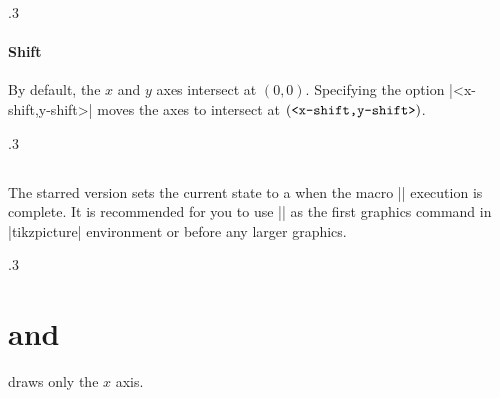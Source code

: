 \begin{tzcode}{.3}
\end{tzcode}

\paragraph{Shift}
By default, the $x$ and $y$ axes intersect at $(0,0)$.
Specifying the option |<x-shift,y-shift>| moves the axes to intersect at $(\text{\ttfamily<x-shift,y-shift>})$.


\begin{tzcode}{.3}
\end{tzcode}


\subsection{\protect\cmd{\tzaxes*}}
\label{ss:tzaxes*}

The starred version \icmd{\tzaxes*} sets the current state to a  when the macro |\tzaxes| execution is complete. It is recommended for you to use |\tzaxes*| as the first graphics command in |tikzpicture| environment or before any larger graphics.

\begin{tzcode}{.3}
\end{tzcode}


\section{\protect\cmd{\tzaxisx} and \protect\cmd{\tzaxisy}}
\label{s:tzaxisx}

\icmd{\tzaxisx} draws only the $x$ axis.

